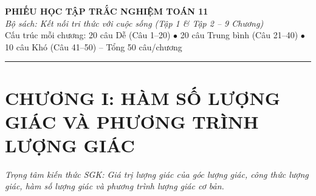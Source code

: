 \documentclass[11pt,a4paper]{article}
\begin{document}
\begin{center}
  {\LARGE\bfseries\color{primary} PHIẾU HỌC TẬP TRẮC NGHIỆM TOÁN 11}\\[4pt]
  {\normalsize\itshape\color{accent} Bộ sách: Kết nối tri thức với cuộc sống (Tập 1 \& Tập 2 – 9 Chương)}\\[4pt]
  {\small Cấu trúc mỗi chương: 20 câu Dễ (Câu 1--20) $\bullet$ 20 câu Trung bình (Câu 21--40) $\bullet$ 10 câu Khó (Câu 41--50) -- Tổng 50 câu/chương}
\end{center}
\vspace{6pt}\hrule\vspace{10pt}
\section*{\color{primary} CHƯƠNG I: HÀM SỐ LƯỢNG GIÁC VÀ PHƯƠNG TRÌNH LƯỢNG GIÁC}
\textit{Trọng tâm kiến thức SGK: Giá trị lượng giác của góc lượng giác, công thức lượng giác, hàm số lượng giác và phương trình lượng giác cơ bản.}\par\vspace{4pt}
\end{document}
